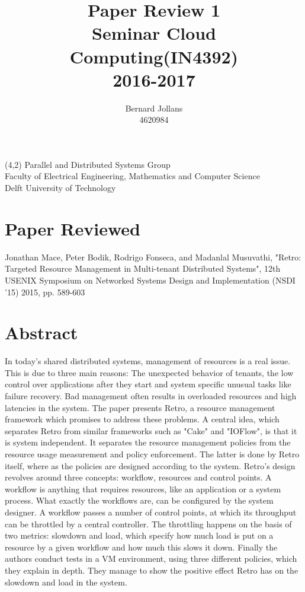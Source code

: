 \documentclass[a4paper]{article}
\begin{document}
\begin{textblock}{10}(4,2)
\noindent\footnotesize Parallel and Distributed Systems Group\\
Faculty of Electrical Engineering, Mathematics and Computer Science\\
Delft University of Technology
\end{textblock}
\title{\vspace{-2cm}Paper Review 1\\ Seminar Cloud Computing(IN4392)\\2016-2017}
\author{Bernard Jollans \\ 4620984}
\maketitle
\section{Paper Reviewed}
Jonathan Mace, 
 Peter Bodik,  
Rodrigo Fonseca, 
and Madanlal Musuvathi,
"Retro: Targeted Resource Management in  
Multi-tenant Distributed Systems",
12th USENIX Symposium on Networked Systems  
Design and Implementation (NSDI ’15) 2015, pp. 589-603

\section{Abstract}
In today's shared distributed systems, management of resources is a real issue. This is due to three main reasons: The unexpected behavior of tenants, the low control over applications after they start and system specific unusual tasks like failure recovery. Bad management often results in overloaded resources and high latencies in the system. The paper presents Retro, a resource management framework which promises to address these problems. A central idea, which separates Retro from similar frameworks such as "Cake" and "IOFlow", is that it is system independent. It separates the resource management policies from the resource usage measurement and policy enforcement. The latter is done by Retro itself, where as the policies are designed according to the system. Retro's design revolves around three concepts: workflow, resources and control points. A workflow is anything that requires resources, like an application or a system process. What exactly the workflows are, can be configured by the system designer. A workflow passes a number of control points, at which its throughput can be throttled by a central controller. The throttling happens on the basis of two metrics: slowdown and load, which specify how much load is put on a resource by a given workflow and how much this slows it down. Finally the authors conduct tests in a VM environment, using three different policies, which they explain in depth. They manage to show the positive effect Retro has on the slowdown and load in the system.
\end{document}

